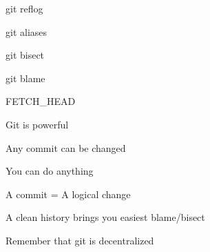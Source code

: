 \begin{iframe}[Homework]
    \item git reflog
    \item git aliases
    \item git bisect
    \item git blame
    \item FETCH\_HEAD
\end{iframe}

\begin{iframe}[conclusion]
\item Git is powerful
\item Any commit can be changed
\item You can do anything
\item A commit = A logical change
\item A clean history brings you easiest blame/bisect
\item Remember that git is decentralized
\end{iframe}
\renewcommand{\insertLogo}{}
\contactSlide
